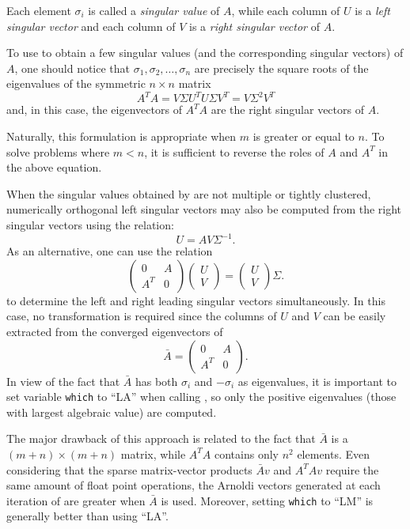 Each element $\sigma_{i} $ is called a \textit{singular value} of $A$, while each column of $U$ is a \textit{left singular vector} and each column of $V$ is a \textit{right singular vector} of $A$.

To use \ARPP{} to obtain a few singular values (and the corresponding singular vectors) of $A$, one should notice that $\sigma_{1} ,\sigma_{2} ,\ldots ,\sigma_{n} $ are precisely the square roots of the eigenvalues of the symmetric $n\times n$ matrix
\[A^{T} A=V\Sigma U^{T} U\Sigma V^{T} =V\Sigma ^{2} V^{T} \] 
and, in this case, the eigenvectors of $A^{T} A$ are the right singular vectors of $A$. 

Naturally, this formulation is appropriate when $m$ is greater or equal to $n$. To solve problems where $m<n$, it is sufficient to reverse the roles of $A$ and $A^T$ in the above equation.

When the singular values obtained by \ARPP{} are not multiple or tightly clustered, numerically orthogonal left singular vectors may also be computed from the right singular vectors using the relation:
\[U=AV\Sigma ^{-1}.\] 
As an alternative, one can use the relation 
\[\left(\begin{array}{cc} {0} & {A} \\ {A^{T} } & {0} \end{array}\right)\left(\begin{array}{c} {U} \\ {V} \end{array}\right)=\left(\begin{array}{c} {U} \\ {V} \end{array}\right)\Sigma .\] 
to determine the left and right leading singular vectors simultaneously. In this case, no transformation is required since the columns of $U$ and $V$ can be easily extracted from the converged eigenvectors of 
\[\bar{A}=\left(\begin{array}{cc} {0} & {A} \\ {A^{T} } & {0} \end{array}\right).\] 
In view of the fact that $\bar{A}$ has both $\sigma_{i} $ and $-\sigma_{i} $ as eigenvalues, it is important to set variable \texttt{which} to ``LA'' when calling \ARPP{}, so only the positive eigenvalues (those with largest algebraic value) are computed.

The major drawback of this approach is related to the fact that $\bar{A}$ is a $(m+n)\times (m+n)$ matrix, while $A^{T} A$ contains only $n^{2} $ elements. Even considering that the sparse matrix-vector products $\bar{A}v$ and $A^{T} Av$ require the same amount of float point operations, the Arnoldi vectors generated at each iteration of \ARP{} are greater when $\bar{A}$ is used. Moreover, setting \texttt{which} to ``LM'' is generally better than using ``LA''. 

